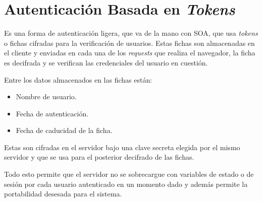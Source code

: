     \section{Autenticación Basada en \textit{Tokens}}
    
    Es una forma de autenticación ligera\cite{ToTOKEN-tokenbasedauth}, que va de la mano con SOA, que usa \textit{tokens} o fichas cifradas para la verificación de usuarios. Estas fichas son almacenadas en el cliente y enviadas en cada una de los \textit{requests} que realiza el navegador, la ficha es decifrada y se verifican las credenciales del usuario en cuestión.
    
    Entre los datos almacenados en las fichas están:
    
    \begin{itemize}
        \item Nombre de usuario.
        \item Fecha de autenticación.
        \item Fecha de caducidad de la ficha.
    \end{itemize}
    
    Estas son cifradas en el servidor bajo una clave secreta elegida por el mismo servidor y que se usa para el posterior decifrado de las fichas.
    
    Todo esto permite que el servidor no se sobrecargue con variables de estado o de sesión por cada usuario autenticado en un momento dado y además permite la portabilidad desesada para el sistema.
    
\pagebreak